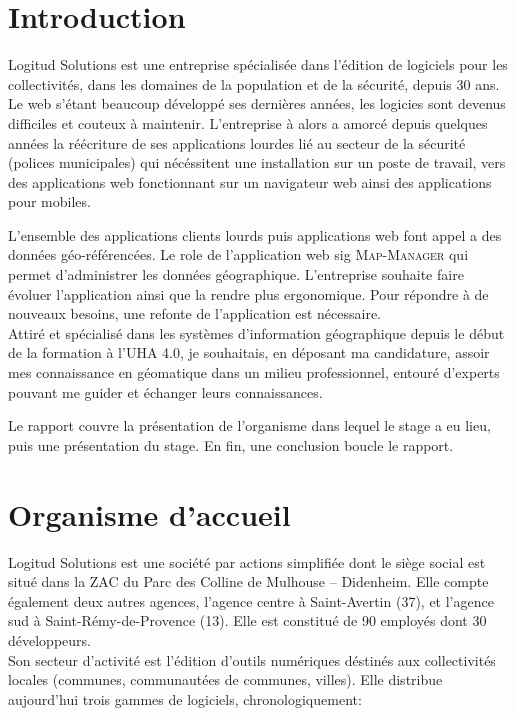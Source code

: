 \documentclass{rapportUHA40}
\begin{document}

\renewcommand{\baselinestretch}{0.9}\normalsize
\tabledematieres%
\renewcommand{\baselinestretch}{1.0}\normalsize

\setcounter{figure}{0}%


\section{Introduction}
Logitud Solutions est une entreprise spécialisée dans l'édition de logiciels
pour les collectivités, dans les domaines de la population et de la sécurité,
depuis 30 ans. Le web s'étant beaucoup développé ses dernières années, les
logicies sont devenus difficiles et couteux à maintenir. L'entreprise à alors a
amorcé depuis quelques années la réécriture de ses applications lourdes lié au
secteur de la sécurité (polices municipales) qui nécéssitent une installation
sur un poste de travail, vers des applications web fonctionnant sur un
navigateur web ainsi des applications pour mobiles.

L'ensemble des applications clients lourds puis applications web font appel a
des données géo-référencées. Le role de l'application web \gls{sig}
\textsc{Map-Manager} qui permet d'administrer les données géographique.
L'entreprise souhaite faire évoluer l'application ainsi que la rendre plus
ergonomique. Pour répondre à de nouveaux besoins, une refonte de l'application
est nécessaire. \\

Attiré et spécialisé dans les systèmes d'information géographique depuis le
début de la formation à l'UHA 4.0, je souhaitais, en déposant ma candidature,
assoir mes connaissance en géomatique dans un milieu professionnel, entouré
d'experts pouvant me guider et échanger leurs connaissances.

\vspace{2cm}

Le rapport couvre la présentation de l'organisme dans lequel le stage a eu
lieu, puis une présentation du stage. En fin, une conclusion boucle le rapport.

\newpage

\section{Organisme d'accueil}
Logitud Solutions est une société par actions simplifiée dont le siège social
est situé dans la ZAC du Parc des Colline de Mulhouse – Didenheim. Elle compte
également deux autres agences, l'agence centre à Saint-Avertin (37), et
l’agence sud à Saint-Rémy-de-Provence (13). Elle est constitué de 90 employés
dont 30 développeurs. \\ Son secteur d'activité est l'édition d'outils
numériques déstinés aux collectivités locales (communes, communautées de
communes, villes). Elle distribue aujourd'hui trois gammes de logiciels,
chronologiquement:
\end{document}
